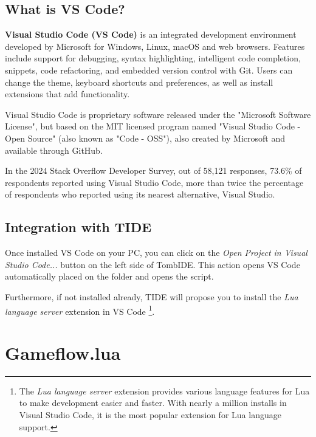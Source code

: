 \subsection{What is VS Code?}
\textbf{Visual Studio Code (VS Code)} is an integrated development environment developed by Microsoft for Windows, Linux, macOS and web browsers. Features include support for debugging, syntax highlighting, intelligent code completion, snippets, code refactoring, and embedded version control with Git. Users can change the theme, keyboard shortcuts and preferences, as well as install extensions that add functionality.

\par Visual Studio Code is proprietary software released under the "Microsoft Software License", but based on the MIT licensed program named "Visual Studio Code - Open Source" (also known as "Code - OSS"), also created by Microsoft and available through GitHub.

\par In the 2024 Stack Overflow Developer Survey, out of 58,121 responses, 73.6\% of respondents reported using Visual Studio Code, more than twice the percentage of respondents who reported using its nearest alternative, Visual Studio. \cite{VSCode_Wikipedia}

\subsection{Integration with TIDE}
Once installed VS Code on your PC, you can click on the \emph{Open Project in Visual Studio Code...} button on the left side of TombIDE. This action opens VS Code automatically placed on the  folder and opens the  script.
\par Furthermore, if not installed already, TIDE will propose you to install the \emph{Lua language server} extension in VS Code \footnote{The \emph{Lua language server} extension provides various language features for Lua to make development easier and faster. With nearly a million installs in Visual Studio Code, it is the most popular extension for Lua language support.}.

\section{Gameflow.lua}

